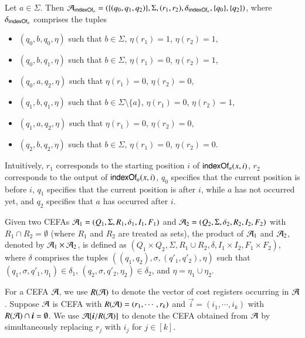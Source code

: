 \begin{example}\label{exm:indexof}
Let $a \in \Sigma$. Then  $\mathcal{A}_{\mathsf{indexOf}_a} = (\{(q_0, q_1, q_2)\}, \Sigma, (r_1,r_2), \delta_{\mathsf{indexOf}_a}, \{q_0\}, \{q_2\})$, where $\delta_{\mathsf{indexOf}_a}$ comprises the tuples
\begin{itemize}
\item $(q_0, b, q_0, \eta)$ such that $b \in \Sigma$, $\eta(r_1)=1$, $\eta(r_2)=1$,
%
\item $(q_0, b, q_1, \eta)$ such that $b \in \Sigma$, $\eta(r_1)=0$, $\eta(r_2) = 1$,
%
\item $(q_0, a, q_2, \eta)$ such that $\eta(r_1)=0$, $\eta(r_2) = 0$,
%
\item $(q_1, b, q_1, \eta)$ such that $b \in \Sigma \setminus \{a\}$, $\eta(r_1)=0$, $\eta(r_2)=1$,
%
\item $(q_1, a, q_2, \eta)$ such that $\eta(r_1)=0$, $\eta(r_2)=0$,
%
\item $(q_2, b, q_2, \eta)$ such that $b \in \Sigma$, $\eta(r_1)=0$, $\eta(r_2)=0$.
\end{itemize}
Intuitively, $r_1$ corresponds to the starting position $i$ of $\mathsf{indexOf}_a(x, i)$, $r_2$ corresponds to the output of $\mathsf{indexOf}_a(x, i)$, $q_0$ specifies that the current position is before $i$, $q_1$ specifies that the current position is after $i$, while $a$ has not occurred yet, and $q_2$ specifies that $a$ has occurred after $i$. 
\end{example}


Given two CEFAs $\mathcal{A}_1 = ( Q_1, \Sigma, R_1, \delta_1, I_1, F_1)$ and $\mathcal{A}_2 = (Q_2, \Sigma, \delta_2, R_2, I_2, F_2)$ with $R_1 \cap R_2 = \emptyset$ (where %
$R_1$ and $R_2$ are treated as sets), the product of $\mathcal{A}_1$ and $\mathcal{A}_2$, denoted by $\mathcal{A}_1 \times \mathcal{A}_2$, is defined as $(Q_1 \times Q_2, \Sigma, R_1 \cup R_2, \delta, I_1 \times I_2, F_1 \times F_2)$, where $\delta$ comprises the tuples $((q_1, q_2), \sigma, (q'_1, q'_2), \eta)$ such that $(q_1, \sigma, q'_1, \eta_1) \in \delta_1$, $(q_2, \sigma, q'_2, \eta_2) \in \delta_2$, and $\eta = \eta_1\cup \eta_2$.  %


For a CEFA $\mathcal{A}$, we use $R(\mathcal{A})$ to denote the vector of cost registers occurring in $\mathcal{A}$. %
Suppose $\mathcal{A}$ is  CEFA with $R(\mathcal{A})=(r_1,\cdots, r_k)$ and $\vec{i} = (i_1,\cdots, i_k)$ with $R(\NFA) \cap \vec{i} = \emptyset$. We use $\CEFA[\vec{i}/R(\CEFA)]$ to denote the CEFA obtained from $\mathcal{A}$ by simultaneously replacing $r_j$ with $i_j$ for $j \in [k]$. 


